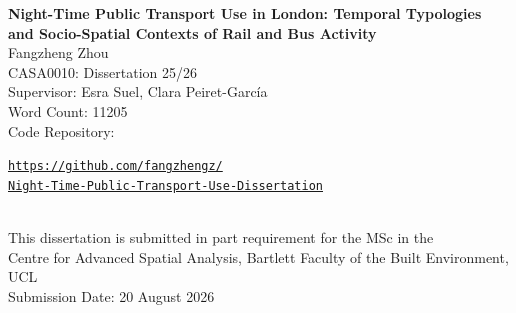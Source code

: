 \setcounter{page}{1}
\thispagestyle{plain}
\begin{center}
\vspace*{4em}
{\Large\bfseries Night-Time Public Transport Use in London: Temporal Typologies and Socio-Spatial Contexts of Rail and Bus Activity}\\[3em]
Fangzheng Zhou\\[3em]
CASA0010: Dissertation 25/26\\[1em]
Supervisor: Esra Suel, Clara Peiret-García\\[1em]
Word Count: 11205\\[1em]
Code Repository:\\
\parbox{0.9\textwidth}{\centering\footnotesize
  \href{https://github.com/fangzhengz/Night-Time-Public-Transport-Use-Dissertation}{\nolinkurl{https://github.com/fangzhengz/}}\\
  \href{https://github.com/fangzhengz/Night-Time-Public-Transport-Use-Dissertation}{\nolinkurl{Night-Time-Public-Transport-Use-Dissertation}}}\\[3em]
This dissertation is submitted in part requirement for the MSc in the\\
Centre for Advanced Spatial Analysis, Bartlett Faculty of the Built Environment, UCL\\[2em]
Submission Date: 20 August 2026
\end{center}
\clearpage

